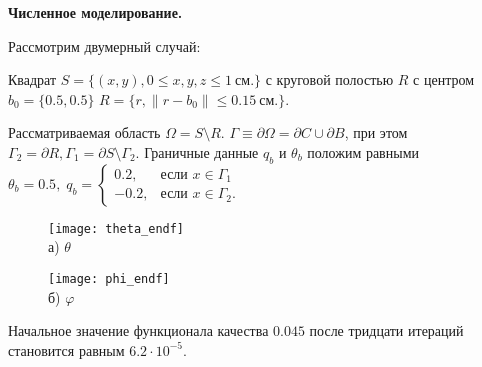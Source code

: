 %
%

\begin{frame}
    \textbf{Численное моделирование.}


    Рассмотрим двумерный случай:

    Квадрат $S = \{(x, y), 0 \leq x,y,z \leq 1~\text{см.}\}$ с
    круговой полостью $R$ с центром $b_0 =\{0.5, 0.5\}$
    $R = \{r, \| r - b_0 \| \leq 0.15~\text{см.} \}$.

    Рассматриваемая область $\Omega = S \setminus R$.
    $\Gamma \equiv \partial \Omega = \partial C \cup \partial B$, при этом
    $ \Gamma_2 = \partial R, \Gamma_1 = \partial S \setminus \Gamma_2$.
    Граничные данные $q_b$ и $\theta_b$ положим равными
    $
    \theta_b = 0.5, \;
    q_b =
    \begin{cases}
        0.2, & \text{если } x \in \Gamma_1 \\
        -0.2, & \text{если } x \in \Gamma_2.
    \end{cases}
    $
    \begin{figure}[h!t]
        \begin{minipage}[b][][b]{0.49\linewidth}
            \centering
            \texttt{[image: theta\_endf]}
            \\ а) $\theta$
        \end{minipage}
        \hfill
        \begin{minipage}[b][][b]{0.49\linewidth}
            \centering
            \texttt{[image: phi\_endf]}
            \\ б) $\varphi$
        \end{minipage}
        \label{fig:4_4:6}
    \end{figure}
    Начальное значение функционала качества $0.045$
    после тридцати итераций становится равным $6.2\cdot10^{-5}$.
\end{frame}
